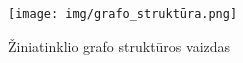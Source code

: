 \begin{figure}[htp!]
\centering
\texttt{[image: img/grafo\_struktūra.png]}
\caption{Žiniatinklio grafo struktūros vaizdas}
\label{fig:graph_structure}
\end{figure}